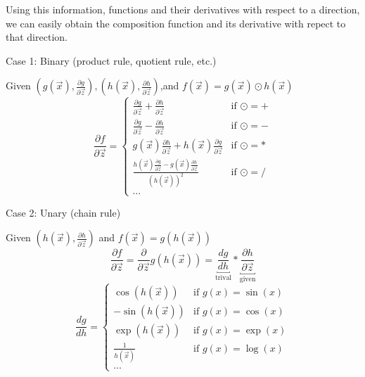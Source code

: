 \documentclass[a0,landscape]{a0poster}
\begin{document}
\begin{multicols}{4}
Using this information, functions and their derivatives with respect to a direction,
we can easily obtain the composition function and its derivative with repect to that direction.

Case 1: Binary (product rule, quotient rule, etc.) 

    Given $(g(\vec{x}),\frac{\partial g}{\partial\vec{z}}),(h(\vec{x}),\frac{\partial h}{\partial\vec{z}})$,and $f(\vec{x})=g(\vec{x})\odot h(\vec{x})$
    \begin{equation}
        \frac{\partial f}{\partial\vec{z}}=
            \begin{cases}
                \frac{\partial g}{\partial\vec{z}} + \frac{\partial h}{\partial\vec{z}} & \text{if } \odot = +\\
                \frac{\partial g}{\partial\vec{z}} - \frac{\partial h}{\partial\vec{z}} & \text{if } \odot = -\\
                g(\vec{x})\frac{\partial h}{\partial\vec{z}} + h(\vec{x})\frac{\partial g}{\partial\vec{z}} & \text{if } \odot = *\\
                \frac{h(\vec{x})\frac{\partial g}{\partial\vec{z}} - g(\vec{x})\frac{\partial h}{\partial\vec{z}}}{(h(\vec{x}))^2} & \text{if } \odot = /\\
                \dots
            \end{cases}
    \end{equation}

Case 2: Unary (chain rule)

    Given $(h(\vec{x}),\frac{\partial h}{\partial\vec{z}})$ and $f(\vec{x})=g(h(\vec{x}))$
    \begin{equation}
        \frac{\partial f}{\partial\vec{z}}=\frac{\partial}{\partial\vec{z}}g(h(\vec{x}))=\underbracket{\frac{dg}{dh}}_{\text{trival}}*\underbracket{\frac{\partial h}{\partial\vec{z}}}_{\text{given}}
    \end{equation}
    \begin{equation}
        \frac{dg}{dh}=
            \begin{cases}
                \cos{(h(\vec{x}))} & \text{if } g(x) = \sin{(x)}\\
                -\sin{(h(\vec{x}))} & \text{if } g(x) = \cos{(x)}\\
                \exp{(h(\vec{x}))} & \text{if } g(x) = \exp{(x)}\\
                \frac{1}{h(\vec{x})} & \text{if } g(x) = \log{(x)}\\
                \dots
            \end{cases}
    \end{equation}


\end{multicols}
\end{document}
